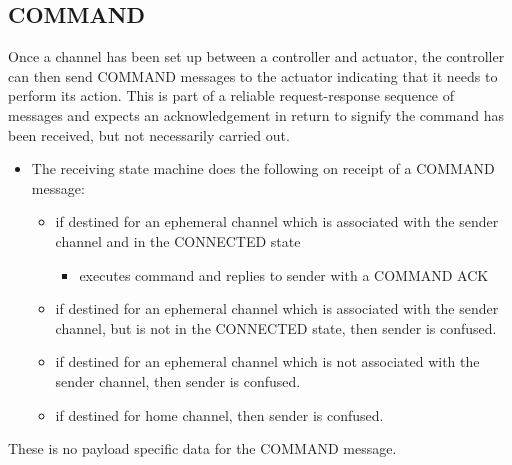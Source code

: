 \subsection{COMMAND} %
\label{sub:command}
Once a channel has been set up between a controller and actuator, the controller can then send COMMAND messages to the actuator indicating that it needs to perform its action. This is part of a reliable request-response sequence of messages and expects an acknowledgement in return to signify the command has been received, but not necessarily carried out.
\begin{itemize}
	\item []The receiving state machine does the following on receipt of a COMMAND message:
	\begin{itemize}
	\item if destined for an ephemeral channel which is associated with the sender channel and in the CONNECTED state
	\begin{itemize}
		\item executes command and replies to sender with a COMMAND ACK
	\end{itemize}
	\item if destined for an ephemeral channel which is associated with the sender channel, but is not in the CONNECTED state, then sender is confused.
	\item if destined for an ephemeral channel which is not associated with the sender channel, then sender is confused.
	\item if destined for home channel, then sender is confused.
	\end{itemize}
\end{itemize}

These is no payload specific data for the COMMAND message.

